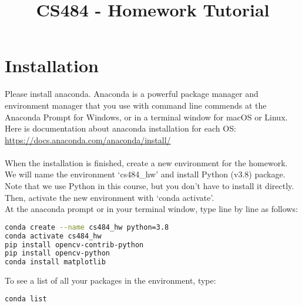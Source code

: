 \documentclass{article}
\date{}
\title{CS484 - Homework Tutorial}
\begin{document}
\maketitle
\vspace{-2cm}
\thispagestyle{fancy}



\section{Installation}

Please install anaconda. Anaconda is a powerful package manager and environment manager that you use with command line commends at the Anaconda Prompt for Windows, or in a terminal window for macOS or Linux. Here is documentation about anaconda installation for each OS:\\ \href{https://docs.anaconda.com/anaconda/install/}{https://docs.anaconda.com/anaconda/install/}\\
\\
When the installation is finished, create a new environment for the homework. We will name the environment `cs484\_hw' and install Python (v3.8) package. Note that we use Python in this course, but you don't have to install it directly. Then, activate the new environment with `conda activate'.\\
At the anaconda prompt or in your terminal window, type line by line as follows:

\begin{lstlisting}[language=bash]
conda create --name cs484_hw python=3.8
conda activate cs484_hw
pip install opencv-contrib-python
pip install opencv-python
conda install matplotlib
\end{lstlisting}

To see a list of all your packages in the environment, type:

\begin{lstlisting}[language=bash]
conda list
\end{lstlisting}
\end{document}
